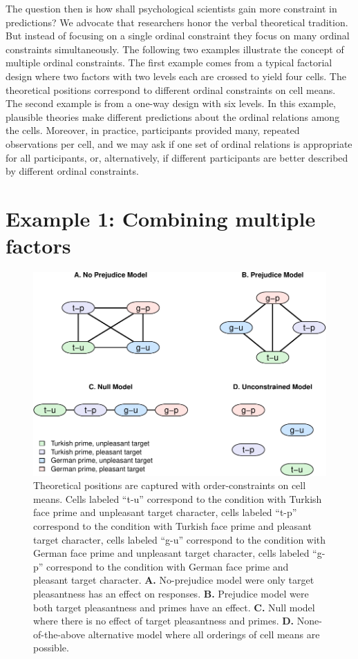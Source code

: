 \documentclass[english,,man]{apa6}
\begin{document}
The question then is how shall psychological scientists gain more constraint in predictions?
We advocate that researchers honor the verbal theoretical tradition. But instead of focusing on a single ordinal constraint they focus on many ordinal constraints simultaneously. The following two examples illustrate the concept of multiple ordinal constraints. The first example comes from a typical factorial design where two factors with two levels each are crossed to yield four cells. The theoretical positions correspond to different ordinal constraints on cell means. The second example is from a one-way design with six levels. In this example, plausible theories make different predictions about the ordinal relations among the cells. Moreover, in practice, participants provided many, repeated observations per cell, and we may ask if one set of ordinal relations is appropriate for all participants, or, alternatively, if different participants are better described by different ordinal constraints.

\hypertarget{example-1-combining-multiple-factors}{%
\section{Example 1: Combining multiple factors}\label{example-1-combining-multiple-factors}}

\begin{figure}
\centering
\includegraphics{p_files/figure-latex/anova-orders-1.pdf}
\caption{\label{fig:anova-orders}Theoretical positions are captured with order-constraints on cell means. Cells labeled \enquote{t-u} correspond to the condition with Turkish face prime and unpleasant target character, cells labeled \enquote{t-p} correspond to the condition with Turkish face prime and pleasant target character, cells labeled \enquote{g-u} correspond to the condition with German face prime and unpleasant target character, cells labeled \enquote{g-p} correspond to the condition with German face prime and pleasant target character. \textbf{A.} No-prejudice model were only target pleasantness has an effect on responses. \textbf{B.} Prejudice model were both target pleasantness and primes have an effect. \textbf{C.} Null model where there is no effect of target pleasantness and primes. \textbf{D.} None-of-the-above alternative model where all orderings of cell means are possible.}
\end{figure}
\end{document}
